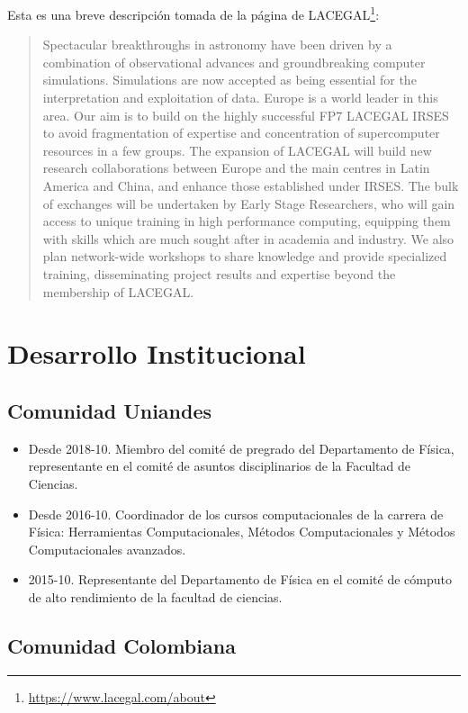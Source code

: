 \documentclass{article}
\begin{document}
\begin{itemize}
Esta es una breve descripci\'on tomada de la p\'agina de LACEGAL\footnote{\url{https://www.lacegal.com/about}}:
\begin{quote}
Spectacular breakthroughs in astronomy have been driven by a combination of observational advances and groundbreaking computer simulations. Simulations are now accepted as being essential for the interpretation and exploitation of data. Europe is a world leader in this area. Our aim is to build on the highly successful FP7 LACEGAL IRSES to avoid fragmentation of expertise and concentration of supercomputer resources in a few groups. The expansion of LACEGAL will build new research collaborations between Europe and the main centres in Latin America and China, and enhance those established under IRSES. The bulk of exchanges will be undertaken by Early Stage Researchers, who will gain access to unique training in high performance computing, equipping them with skills which are much sought after in academia and industry. We also plan network-wide workshops to share knowledge and provide specialized training, disseminating project results and expertise beyond the membership of LACEGAL.
\end{quote}
\end{itemize}



\newpage
\section{Desarrollo Institucional}


\subsection{Comunidad Uniandes}
\begin{itemize}
\item {Desde 2018-10. Miembro del comit\'e de pregrado del
  Departamento de F\'isica, representante en el comit\'e de asuntos
  disciplinarios de la Facultad de Ciencias.}
\item {Desde 2016-10. Coordinador de los cursos computacionales de la carrera de
  F\'isica: Herramientas Computacionales, M\'etodos Computacionales y
  M\'etodos Computacionales avanzados.} 
\item {2015-10. Representante del Departamento de F\'isica en el comit\'e
  de c\'omputo de alto rendimiento de la facultad de ciencias.}
\end{itemize}


\subsection{Comunidad Colombiana}
\end{document}
